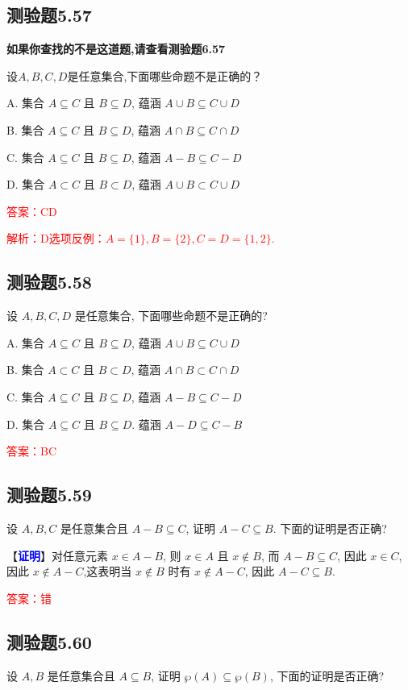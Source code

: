 \documentclass[UTF8, heading=true]{ctexart}
\begin{document}
\subsection{测验题5.57}

\textbf{如果你查找的不是这道题,请查看测验题6.57}

设$A, B, C, D$是任意集合,下面哪些命题不是正确的？

A. 集合 $A \subseteq C$ 且 $B \subseteq D$, 蕴涵 $A \cup B \subseteq C \cup D$

B. 集合 $A \subseteq C$ 且 $B \subseteq D$, 蕴涵 $A \cap B \subseteq C \cap D$

C. 集合 $A \subseteq C$ 且 $B \subseteq D$, 蕴涵 $A-B \subseteq C-D$

D. 集合 $A \subset C$ 且 $B \subset D$, 蕴涵 $A \cup B \subset C \cup D$


\textcolor{red}{答案：CD}

\textcolor{red}{解析：D选项反例：$A=\{1\},B=\{2\},C=D=\{1,2\}$.}

\subsection{测验题5.58}
设 $A, B, C, D$ 是任意集合, 下面哪些命题不是正确的?

A. 
集合 $A \subseteq C$ 且 $B \subseteq D$, 蕴涵 $A \cup B \subseteq C \cup D$

B. 
集合 $A \subset C$ 且 $B \subset D$, 蕴涵 $A \cap B \subset C \cap D$

C. 
集合 $A \subseteq C$ 且 $B \subseteq D$, 蕴涵 $A-B \subseteq C-D$

D. 
集合 $A \subseteq C$ 且 $B \subseteq D$. 蕴涵 $A-D \subseteq C-B$

\textcolor{red}{答案：BC}

\subsection{测验题5.59}

设 $A, B, C$ 是任意集合且 $A-B \subseteq C$, 证明 $A-C \subseteq B$. 下面的证明是否正确?

【\textcolor{blue}{\textbf{证明}}】对任意元素 $x \in A-B$, 则 $x \in A$ 且 $x \notin B$, 而 $A-B \subseteq C$, 因此 $x \in C$, 因此 $x \notin A-C$,这表明当 $x \notin B$ 时有 $x \notin A-C$, 因此 $A-C \subseteq B$.

\textcolor{red}{答案：错}
\subsection{测验题5.60}
设 $A, B$ 是任意集合且 $A \subseteq B$, 证明 $\wp(A) \subseteq \wp(B)$, 下面的证明是否正确?
\end{document}
